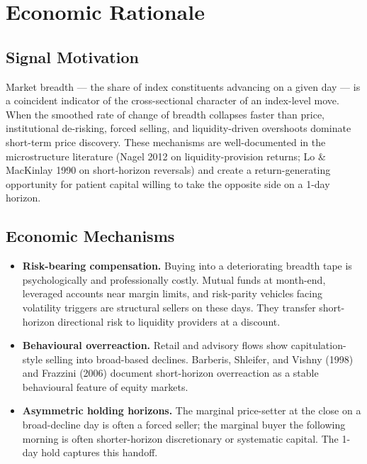 \documentclass[11pt]{article}
\begin{document}
\newpage

\section{Economic Rationale}

\subsection{Signal Motivation}

Market breadth --- the share of index constituents advancing on a given day
--- is a coincident indicator of the cross-sectional character of an
index-level move. When the smoothed rate of change of breadth collapses
faster than price, institutional de-risking, forced selling, and
liquidity-driven overshoots dominate short-term price discovery. These
mechanisms are well-documented in the microstructure literature
(Nagel 2012 on liquidity-provision returns; Lo \& MacKinlay 1990 on short-horizon reversals) and
create a return-generating opportunity for patient capital willing to take
the opposite side on a 1-day horizon.

\subsection{Economic Mechanisms}

\begin{itemize}
\item \textbf{Risk-bearing compensation.} Buying into a deteriorating
breadth tape is psychologically and professionally costly. Mutual funds at
month-end, leveraged accounts near margin limits, and risk-parity vehicles
facing volatility triggers are structural sellers on these days. They
transfer short-horizon directional risk to liquidity providers at a
discount.
\item \textbf{Behavioural overreaction.} Retail and advisory flows show
capitulation-style selling into broad-based declines. Barberis, Shleifer,
and Vishny (1998) and Frazzini (2006) document short-horizon overreaction
as a stable behavioural feature of equity markets.
\item \textbf{Asymmetric holding horizons.} The marginal price-setter at
the close on a broad-decline day is often a forced seller; the marginal
buyer the following morning is often shorter-horizon discretionary or
systematic capital. The 1-day hold captures this handoff.
\end{itemize}
\end{document}
